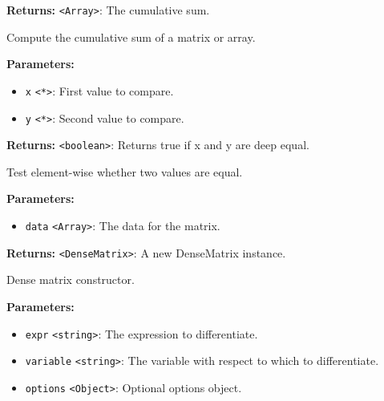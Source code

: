 \documentclass[12pt,a4paper]{article}
\begin{document}
\noindent \textbf{Returns:} \texttt{<Array>}: The cumulative sum.

\noindent Compute the cumulative sum of a matrix or array.

\vspace{5mm}
\noindent {}


\noindent \textbf{Parameters:}
\begin{itemize}
  \item \texttt{x} \texttt{<*>}: First value to compare.
  \item \texttt{y} \texttt{<*>}: Second value to compare.
\end{itemize}

\noindent \textbf{Returns:} \texttt{<boolean>}: Returns true if x and y are deep equal.

\noindent Test element-wise whether two values are equal.

\vspace{5mm}
\noindent {}


\noindent \textbf{Parameters:}
\begin{itemize}
  \item \texttt{data} \texttt{<Array>}: The data for the matrix.
\end{itemize}

\noindent \textbf{Returns:} \texttt{<DenseMatrix>}: A new DenseMatrix instance.

\noindent Dense matrix constructor.

\vspace{5mm}
\noindent {}


\noindent \textbf{Parameters:}
\begin{itemize}
  \item \texttt{expr} \texttt{<string>}: The expression to differentiate.
  \item \texttt{variable} \texttt{<string>}: The variable with respect to which to differentiate.
  \item \texttt{options} \texttt{<Object>}: Optional options object.
\end{itemize}
\end{document}
